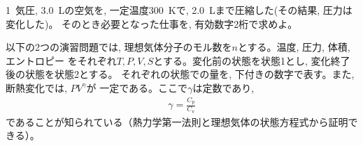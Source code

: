 \begin{exq} 1~気圧, 3.0~Lの空気を, 一定温度300~Kで, 2.0~Lまで圧縮した(その結果, 圧力は変化した)。
そのとき必要となった仕事を, 有効数字2桁で求めよ。\end{exq}

以下の2つの演習問題では, 理想気体分子のモル数を$n$とする。温度, 圧力, 体積, エントロピー
をそれぞれ$T, P, V, S$とする。変化前の状態を状態1とし, 変化終了後の状態を状態2とする。
それぞれの状態での量を, 下付きの数字で表す。また, 断熱変化では, $PV^{\gamma}$が
一定である。ここで$\gamma$は定数であり, 
\begin{eqnarray}
\gamma=\frac{C_{\text{p}}}{C_{\text{v}}}
\end{eqnarray}
であることが知られている（熱力学第一法則と理想気体の状態方程式から証明できる）。

